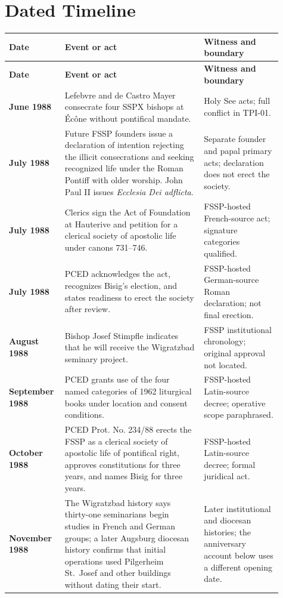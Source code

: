 \section{Dated Timeline}

\begin{longtable}{>{\bfseries\RaggedRight\arraybackslash}p{0.16\linewidth}>{\RaggedRight\arraybackslash}p{0.48\linewidth}>{\RaggedRight\arraybackslash}p{0.27\linewidth}}
\toprule
\textbf{Date} & \textbf{Event or act} & \textbf{Witness and boundary}\\
\midrule
\endfirsthead
\toprule
\textbf{Date} & \textbf{Event or act} & \textbf{Witness and boundary}\\
\midrule
\endhead
\bottomrule
\endfoot
30 June 1988 & Lefebvre and de Castro Mayer consecrate four SSPX bishops at Écône without pontifical mandate. & Holy See acts; full conflict in TPI-01.\\
2 July 1988 & Future FSSP founders issue a declaration of intention rejecting the illicit consecrations and seeking recognized life under the Roman Pontiff with older worship. John Paul II issues \emph{Ecclesia Dei adflicta}. & Separate founder and papal primary acts; declaration does not erect the society.\\
18 July 1988 & Clerics sign the Act of Foundation at Hauterive and petition for a clerical society of apostolic life under canons 731--746. & FSSP-hosted French-source act; signature categories qualified.\\
22 July 1988 & PCED acknowledges the act, recognizes Bisig's election, and states readiness to erect the society after review. & FSSP-hosted German-source Roman declaration; not final erection.\\
August 1988 & Bishop Josef Stimpfle indicates that he will receive the Wigratzbad seminary project. & FSSP institutional chronology; original approval not located.\\
10 September 1988 & PCED grants use of the four named categories of 1962 liturgical books under location and consent conditions. & FSSP-hosted Latin-source decree; operative scope paraphrased.\\
18 October 1988 & PCED Prot. No. 234/88 erects the FSSP as a clerical society of apostolic life of pontifical right, approves constitutions for three years, and names Bisig for three years. & FSSP-hosted Latin-source decree; formal juridical act.\\
November 1988 & The Wigratzbad history says thirty-one seminarians begin studies in French and German groups; a later Augsburg diocesan history confirms that initial operations used Pilgerheim St.~Josef and other buildings without dating their start. & Later institutional and diocesan histories; the anniversary account below uses a different opening date.\\

\end{longtable}
